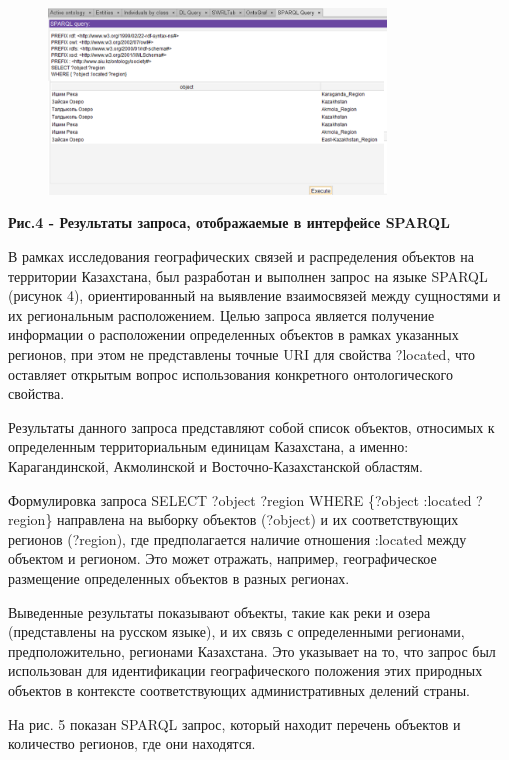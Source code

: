 \begin{figure}[H]
	\centering
	\includegraphics[width=0.8\textwidth]{assets/41}
	\caption*{}
\end{figure}

\textbf{Рис.4 - Результаты запроса, отображаемые в интерфейсе SPARQL}

В рамках исследования географических связей и распределения объектов на
территории Казахстана, был разработан и выполнен запрос на языке SPARQL
(рисунок 4), ориентированный на выявление взаимосвязей между сущностями
и их региональным расположением. Целью запроса является получение
информации о расположении определенных объектов в рамках указанных
регионов, при этом не представлены точные URI для свойства ?located, что
оставляет открытым вопрос использования конкретного онтологического
свойства.

Результаты данного запроса представляют собой список объектов, относимых
к определенным территориальным единицам Казахстана, а именно:
Карагандинской, Акмолинской и Восточно-Казахстанской областям.

Формулировка запроса SELECT ?object ?region WHERE \{?object :located
?region\} направлена на выборку объектов (?object) и их соответствующих
регионов (?region), где предполагается наличие отношения :located между
объектом и регионом. Это может отражать, например, географическое
размещение определенных объектов в разных регионах.

Выведенные результаты показывают объекты, такие как реки и озера
(представлены на русском языке), и их связь с определенными регионами,
предположительно, регионами Казахстана. Это указывает на то, что запрос
был использован для идентификации географического положения этих
природных объектов в контексте соответствующих административных делений
страны.

На рис. 5 показан SPARQL запрос, который находит перечень объектов и
количество регионов, где они находятся.


